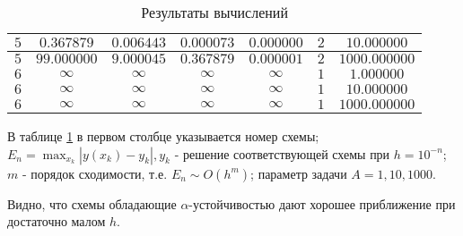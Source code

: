 \documentclass[14pt,a4paper]{extarticle}
\newcommand{\1}{\mathbbm{1}}
\begin{document}
\begin{table}[h!]
\begin{center}
\begin{tabular}{|c|c|c|c|c|c|c|}
     $5$ &  $0.367879$ & $0.006443$ & $0.000073$ & $0.000000$ & $2$ & $10.000000$ \\ \hline 
    
     $5$ &  $99.000000$ & $9.000045$ & $0.367879$ & $0.000001$ & $2$ & $1000.000000$ \\ \hline 
    
     $6$ &  $\infty$ & $\infty$ & $\infty$ & $\infty$ & $1$ & $1.000000$ \\ \hline 
    
     $6$ &  $\infty$ & $\infty$ & $\infty$ & $\infty$ & $1$ & $10.000000$ \\ \hline 
    
     $6$ &  $\infty$ & $\infty$ & $\infty$ & $\infty$ & $1$ & $1000.000000$ \\ \hline 
    \end{tabular} 
    \end{center}\caption{Результаты вычислений}  
    \label{Aggreg1CU} \end{table} 
     
     
     

    В таблице \ref{Aggreg1CU} в первом столбце указывается номер схемы;
    $E_n=\max _{x_k}\left|y\left(x_k\right)-y_k\right|, y_k$ 
    - решение соответствующей схемы при $h=10^{-n}$; $m$ - порядок сходимости, т.е. $E_n \sim O\left(h^m\right)$;
    параметр задачи $A=1,10,1000$. 
    \par
    Видно, что схемы обладающие $\alpha$-устойчивостью дают хорошее приближение при достаточно малом $h$. 
     
     
\end{document}
